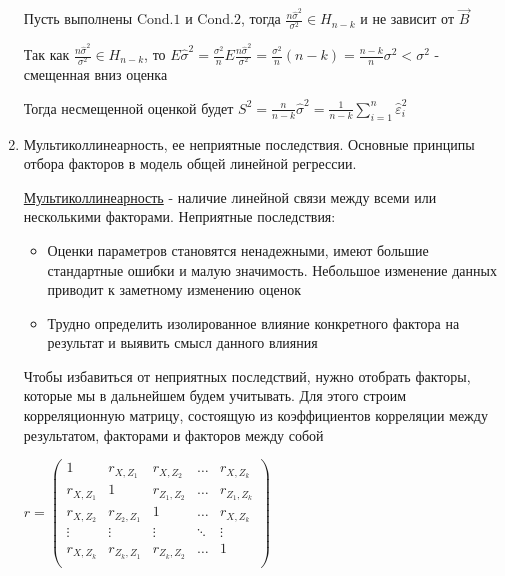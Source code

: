 \documentclass[12pt]{article}
\begin{document}
\begin{enumerate}
    \begin{MyTheorem}
        Пусть выполнены $\mathrm{Cond. 1}$ и $\mathrm{Cond. 2}$, тогда $\frac{n \hat \sigma^2}{\sigma^2} \in H_{n - k}$ и не зависит от $\vec B$
    \end{MyTheorem}
    
    Так как $\frac{n \hat \sigma^2}{\sigma^2} \in H_{n - k}$, то $E \hat \sigma^2 = \frac{\sigma^2}{n} E \frac{n \hat \sigma^2}{\sigma^2} = \frac{\sigma^2}{n} (n - k) = \frac{n - k}{n} \sigma^2 < \sigma^2$ - смещенная вниз оценка
    
    Тогда несмещенной оценкой будет $S^2 = \frac{n}{n - k} \hat \sigma^2 = \frac{1}{n - k} \sum_{i = 1}^n \hat \varepsilon_i^2$

    \item Мультиколлинеарность, ее неприятные последствия. Основные принципы отбора факторов в модель общей линейной регрессии.

    \Def \hyperlink{multicollinearity}{Мультиколлинеарность} - наличие линейной связи между всеми или несколькими факторами. Неприятные последствия:

    \begin{itemize}
        \item Оценки параметров становятся ненадежными, имеют большие стандартные ошибки и малую значимость.
        Небольшое изменение данных приводит к заметному изменению оценок
        \item Трудно определить изолированное влияние конкретного фактора на результат и выявить смысл данного влияния
    \end{itemize}

    Чтобы избавиться от неприятных последствий, нужно отобрать факторы, которые мы в дальнейшем будем учитывать. Для этого строим корреляционную матрицу, состоящую из коэффициентов корреляции между результатом, факторами и факторов между собой 

    \smallvspace

    $r = \begin{pmatrix}
        1 & r_{X, Z_1} & r_{X, Z_2} & \dots & r_{X, Z_k} \\ 
        r_{X, Z_1} & 1 & r_{Z_1, Z_2} & \dots & r_{Z_1, Z_k} \\ 
        r_{X, Z_2} & r_{Z_2, Z_1} & 1 & \dots & r_{X, Z_k} \\ 
        \vdots & \vdots & \vdots & \ddots & \vdots \\ 
        r_{X, Z_k} & r_{Z_k, Z_1} & r_{Z_k, Z_2} & \dots & 1 \\ 
    \end{pmatrix}$


\end{enumerate}
\end{document}
